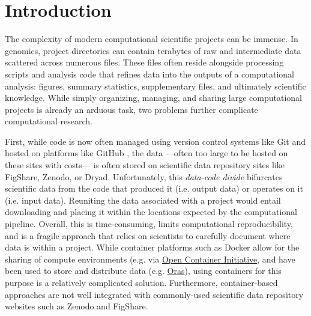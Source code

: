 \documentclass[unnumsec,webpdf,contemporary,large]{oup-authoring-template}%
\theoremstyle{thmstyleone}%
\theoremstyle{thmstyletwo}%
\theoremstyle{thmstylethree}%
\begin{document}

\maketitle


\section{Introduction}

The complexity of modern computational scientific projects can be
immense. In genomics, project directories can contain terabytes of raw
and intermediate data scattered across numerous files. These files often
reside alongside processing scripts and analysis code that refines data
into the outputs of a computational analysis: figures, summary
statistics, supplementary files, and ultimately scientific knowledge.
While simply organizing, managing, and sharing large computational projects is
already an arduous task, two problems further complicate computational
research.

First, while code is now often managed using version control systems like Git
and hosted on platforms like GitHub \citep{Ram2013-ub,Buffalo2015-lo}, the
data ---often too large to be hosted on these sites with costs--- is often stored on scientific data
repository sites like FigShare, Zenodo, or Dryad. Unfortunately, this
\emph{data-code divide} bifurcates scientific data from the code that produced
it (i.e. output data) or operates on it (i.e. input data). Reuniting the data
associated with a project would entail downloading and placing it within the
locations expected by the computational pipeline. Overall, this is
time-consuming, limits computational reproducibility, and is a fragile approach
that relies on scientists to carefully document where data is within a project. 
While container platforms such as Docker \citep{Boettiger2015-fy} allow for the sharing of compute environments (e.g. via \href{https://opencontainers.org/}{Open Container Initiative}, and have been used to store and distribute data (e.g. \href{https://oras.land/}{Oras}), using containers for this purpose is a relatively complicated solution. Furthermore, container-based approaches are not well integrated with commonly-used scientific data repository websites such as Zenodo and FigShare.
\end{document}
